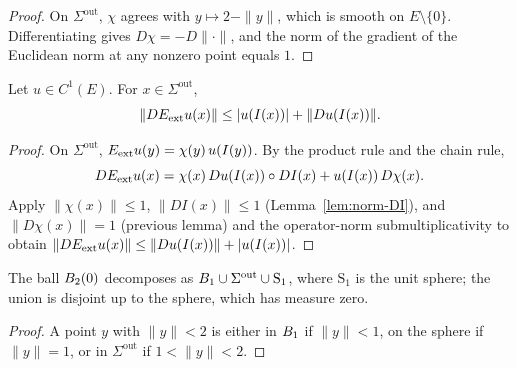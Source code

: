 \begin{proof}
\leanok
{}

On $\Sigma^{\mathrm{out}}$, $\chi$ agrees with $y \mapsto 2 - \|y\|$, which
is smooth on $E\setminus\{0\}$. Differentiating gives
$D\chi = -D\|\cdot\|$, and the norm of the gradient of the Euclidean norm at
any nonzero point equals $1$.
\end{proof}

\begin{lemma}
\label{lem:Eext-grad-bound}
\leanok
{}
Let $u \in C^1(E)$. For $x \in \Sigma^{\mathrm{out}}$,
\begin{equation*}
\|DE_{\mathrm{ext}} u(x)\|
\le |u(I(x))| + \|Du(I(x))\|.
\end{equation*}
\end{lemma}

\begin{proof}
\leanok
{}

On $\Sigma^{\mathrm{out}}$, $E_{\mathrm{ext}} u(y) = \chi(y)\, u(I(y))$. By the product
rule and the chain rule,
\begin{equation*}
DE_{\mathrm{ext}} u (x) = \chi(x)\, Du(I(x))\circ DI(x) + u(I(x))\, D\chi(x).
\end{equation*}
Apply $\|\chi(x)\| \le 1$, $\|DI(x)\| \le 1$ (Lemma~\ref{lem:norm-DI}), and
$\|D\chi(x)\| = 1$ (previous lemma) and the operator-norm submultiplicativity
to obtain
$\|DE_{\mathrm{ext}} u(x)\| \le \|Du(I(x))\| + |u(I(x))|$.
\end{proof}

\begin{lemma}
\label{lem:ball_zero_two_eq_ball_zero_one_union_outerShell_union_sphere}
\leanok
{}
The ball $B_{2}(0)$ decomposes as
$B_{1} \cup \Sigma^{\mathrm{out}} \cup \mathrm{S}_1$, where $\mathrm{S}_1$ is
the unit sphere; the union is disjoint up to the sphere, which has measure
zero.
\end{lemma}

\begin{proof}
\leanok

A point $y$ with $\|y\| < 2$ is either in $B_{1}$ if $\|y\| < 1$, on the
sphere if $\|y\| = 1$, or in $\Sigma^{\mathrm{out}}$ if $1 < \|y\| < 2$.
\end{proof}

